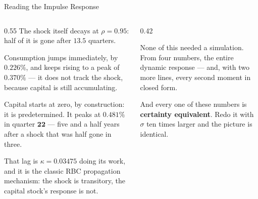 \begin{frame}{Reading the Impulse Response}
\begin{columns}[T]
\begin{column}{0.55\textwidth}
\small
The shock itself decays at $\rho=0.95$: half of it is gone after $13.5$ quarters.
\medskip

Consumption jumps immediately, by $0.226\%$, and keeps rising to a peak of $\mathbf{0.370\%}$ --- it does not track the shock, because capital is still accumulating.
\medskip

Capital starts at zero, by construction: it is predetermined. It peaks at $\mathbf{0.481\%}$ in quarter $\mathbf{22}$ --- five and a half years after a shock that was half gone in three.
\medskip

That lag is $\kappa=0.03475$ doing its work, and it is the classic RBC propagation mechanism: the shock is transitory, the capital stock's response is not.
\end{column}
\begin{column}{0.42\textwidth}
\begin{takeawaybox}\footnotesize
None of this needed a simulation. From four numbers, the entire dynamic response --- and, with two more lines, every second moment in closed form.
\end{takeawaybox}
\medskip
\begin{cautionbox}\footnotesize
And every one of these numbers is \textbf{certainty equivalent}. Redo it with $\sigma$ ten times larger and the picture is identical.
\end{cautionbox}
\end{column}
\end{columns}
\vspace{1mm}
\end{frame}

